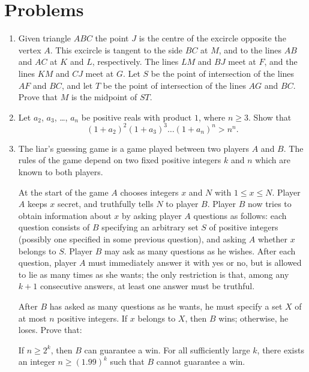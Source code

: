 \documentclass[11pt]{scrartcl}
\begin{document}
\section{Problems}
\begin{enumerate}[\bfseries 1.]
\item %
Given triangle $ABC$ the point $J$ is the centre of the excircle
opposite the vertex $A$. This excircle is tangent to the side $BC$ at
$M$, and to the lines $AB$ and $AC$ at $K$ and $L$, respectively. The
lines $LM$ and $BJ$ meet at $F$, and the lines $KM$ and $CJ$ meet at
$G$. Let $S$ be the point of intersection of the lines $AF$ and $BC$,
and let $T$ be the point of intersection of the lines $AG$ and $BC$.
Prove that $M$ is the midpoint of $ST$.

\item %
Let $a_2$, $a_3$, \dots, $a_n$ be positive reals with product $1$,
where $n \ge 3$.
Show that
\[ (1+a_2)^2 (1+a_3)^3 \dots (1+a_n)^n > n^n. \]

\item %
The liar's guessing game is a game played between two players $A$ and $B$.
The rules of the game depend on two fixed positive integers $k$ and $n$
which are known to both players.

At the start of the game $A$
chooses integers $x$ and $N$ with $1 \le x \le N$.
Player $A$ keeps $x$ secret, and truthfully tells $N$ to player $B$.
Player $B$ now tries to obtain information about $x$
by asking player $A$ questions as follows:
each question consists of $B$ specifying an arbitrary set $S$
of positive integers (possibly one specified in some previous question),
and asking $A$ whether $x$ belongs to $S$.
Player $B$ may ask as many questions as he wishes.
After each question, player $A$ must immediately answer
it with yes or no, but is allowed to lie as many times as she wants;
the only restriction is that, among any $k+1$ consecutive answers,
at least one answer must be truthful.

After $B$ has asked as many questions as he wants,
he must specify a set $X$ of at most $n$ positive integers.
If $x$ belongs to $X$, then $B$ wins;
otherwise, he loses.
Prove that:

\begin{enumerate}[(a)]
  \ii If $n \ge 2^k$, then $B$ can guarantee a win.
  \ii For all sufficiently large $k$,
  there exists an integer $n \ge (1.99)^k$
  such that $B$ cannot guarantee a win.
\end{enumerate}


\end{enumerate}
\end{document}

